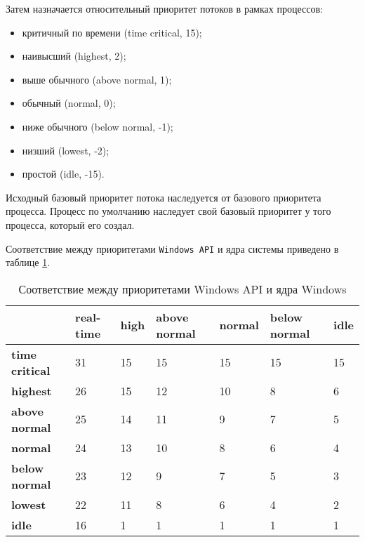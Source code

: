 Затем назначается относительный приоритет потоков в рамках процессов:

\begin{itemize}
    \item критичный по времени (time critical, 15);
    \item наивысший (highest, 2);
    \item выше обычного (above normal, 1);
    \item обычный (normal, 0);
    \item ниже обычного (below normal, -1);
    \item низший (lowest, -2);
    \item простой (idle, -15).
\end{itemize}

Исходный базовый приоритет потока наследуется от базового приоритета процесса. Процесс по умолчанию наследует свой базовый приоритет у того процесса, который его создал.

Соответствие между приоритетами \texttt{Windows API} и ядра системы приведено в таблице \ref{tbl:priority}.
\clearpage

\begin{table}[h]
    \caption{Соответствие между приоритетами Windows API и ядра Windows}
    \begin{center}
        \begin{tabular}{|l|p{45pt}|p{45pt}|p{45pt}|p{45pt}|p{45pt}|p{45pt}|}
            \hline
            {} & \textbf{real-time} & \textbf{high} & \textbf{above normal} & \textbf{normal} & \textbf{below normal} & \textbf{idle}\\
            \hline
            \textbf{time critical} & 31 & 15 & 15 & 15 & 15 & 15 \\
            \hline
            \textbf{highest} & 26 & 15 & 12 & 10 & 8 & 6 \\
            \hline
            \textbf{above normal} & 25 & 14 & 11 & 9 & 7 & 5 \\
            \hline
            \textbf{normal} & 24 & 13 & 10 & 8 & 6 & 4 \\
            \hline
            \textbf{below normal} & 23 & 12 & 9 & 7 & 5 & 3 \\
            \hline
            \textbf{lowest} & 22 & 11 & 8 & 6 & 4 & 2 \\
            \hline
            \textbf{idle} & 16 & 1 & 1 & 1 & 1 & 1 \\
            \hline
        \end{tabular}
    \end{center}
    \label{tbl:priority}
\end{table}


